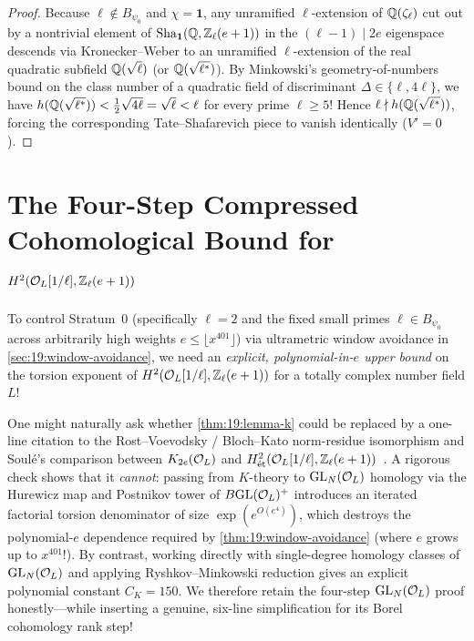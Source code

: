\begin{proof}
Because $\ell \notin B_{\psi_0}$ and $\chi = \mathbf{1}$, any unramified $\ell$-extension of $\mathbb{Q}(\zeta_\ell)$ cut out by a nontrivial element of $\mathrm{Sha}_{\mathbf{1}}(\mathbb{Q}, \mathbb{Z}_\ell(e+1))$ in the $(\ell - 1) \mid 2e$ eigenspace descends via Kronecker--Weber to an unramified $\ell$-extension of the real quadratic subfield $\mathbb{Q}(\sqrt{\ell})$ (or $\mathbb{Q}(\sqrt{\ell^*})$). By Minkowski's geometry-of-numbers bound on the class number of a quadratic field of discriminant $\Delta \in \{\ell, 4\ell\}$, we have $h(\mathbb{Q}(\sqrt{\ell^*})) < \frac{1}{2}\sqrt{4\ell} = \sqrt{\ell} < \ell$ for every prime $\ell \ge 5$! Hence $\ell \nmid h(\mathbb{Q}(\sqrt{\ell^*}))$, forcing the corresponding Tate--Shafarevich piece to vanish identically ($V' = 0$).
\end{proof}

\section{The Four-Step Compressed Cohomological Bound for $H^2(\mathcal{O}_L[1/\ell], \mathbb{Z}_\ell(e+1))$}
\label{sec:19:lemma-k}

To control Stratum~0 (specifically $\ell = 2$ and the fixed small primes $\ell \in B_{\psi_0}$ across arbitrarily high weights $e \le \lfloor x^{401}\rfloor$) via ultrametric window avoidance in \cref{sec:19:window-avoidance}, we need an \emph{explicit, polynomial-in-$e$ upper bound} on the torsion exponent of $H^2(\mathcal{O}_L[1/\ell], \mathbb{Z}_\ell(e+1))$ for a totally complex number field $L$!

\begin{remark}
\label{rem:19:soule-obstruction}
One might naturally ask whether \cref{thm:19:lemma-k} could be replaced by a one-line citation to the Rost--Voevodsky / Bloch--Kato norm-residue isomorphism and Soul\'e's comparison between $K_{2e}(\mathcal{O}_L)$ and $H^2_{\text{\'et}}(\mathcal{O}_L[1/\ell], \mathbb{Z}_\ell(e+1))$~\cite{Soule1999}. A rigorous check shows that it \emph{cannot}: passing from $K$-theory to $\mathrm{GL}_N(\mathcal{O}_L)$ homology via the Hurewicz map and Postnikov tower of $B\mathrm{GL}(\mathcal{O}_L)^+$ introduces an iterated factorial torsion denominator of size $\exp(e^{O(e^4)})$, which destroys the polynomial-$e$ dependence required by \cref{thm:19:window-avoidance} (where $e$ grows up to $x^{401}$!). By contrast, working directly with single-degree homology classes of $\mathrm{GL}_N(\mathcal{O}_L)$ and applying Ryshkov--Minkowski reduction gives an explicit polynomial constant $C_K = 150$. We therefore retain the four-step $\mathrm{GL}_N(\mathcal{O}_L)$ proof honestly—while inserting a genuine, six-line simplification for its Borel cohomology rank step!
\end{remark}

